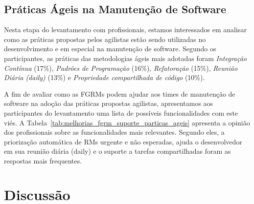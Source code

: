 \subsection{Práticas Ágeis na Manutenção de Software}
\label{sub:práticas_ágeis_na_manutenção_de_software}

Nesta etapa do levantamento com profissionais, estamos interessados em analisar
como as práticas propostas pelos agilistas estão sendo utilizadas no
desenvolvimento e em especial na manutenção de software. Segundo os
participantes, as práticas das metodologias ágeis mais adotadas foram
\textit{Integração Contínua} (17\%), \textit{Padrões de Programação} (16\%),
\textit{Refatoração} (15\%), \textit{Reunião Diária (daily)} (13\%) e
\textit{Propriedade compartilhada de código} (10\%).

A fim de avaliar como as FGRMs podem ajudar aos times de manutenção de software
na adoção das práticas propostas agilistas, apresentamos aos participantes do
levantamento uma lista de possíveis funcionalidades com este viés. A
Tabela~\ref{tab:melhorias_fgrm_suporte_particas_ageis} apresenta a opinião dos
profissionais sobre as funcionalidades mais relevantes. Segundo eles, a
priorização automática de RMs urgente e não esperadas, ajuda o desenvolvedor em
sua reunião diária (daily) e o suporte a tarefas compartilhadas foram as
respostas mais frequentes.

\begin{table}[htpb]
\centering
{}
\caption{Classificação das funcionalidades que possam dar suporte ao uso das
metodologias dos agilistas.}
\label{tab:melhorias_fgrm_suporte_particas_ageis}
\end{table}

\section{Discussão}


